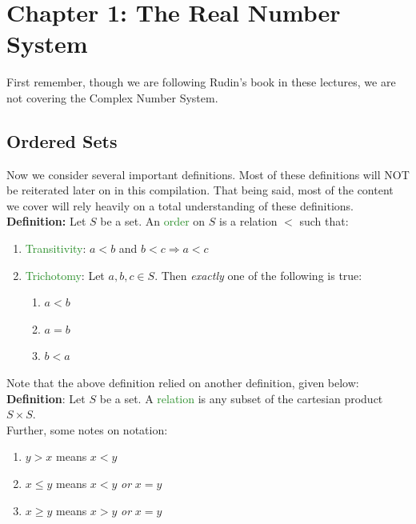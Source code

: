 \documentclass{article}
\begin{document}
\newpage

\section*{Chapter 1: The Real Number System}

First remember, though we are following Rudin's book in these lectures, we are not covering the Complex Number System.



\subsection{Ordered Sets}
Now we consider several important definitions. Most of these definitions will NOT be reiterated later on in this compilation. That being said, most of the content we cover will rely heavily on a total understanding of these definitions.\\

\textbf{Definition:} Let $S$ be a set. An \textcolor{ForestGreen}{order} on $S$ is a relation $<$ such that:
\begin{enumerate}
    \item \textcolor{ForestGreen}{Transitivity}: $a < b$ and $b < c \Longrightarrow a < c$
    \item \textcolor{ForestGreen}{Trichotomy}: Let $a,b,c \in S$. Then \textit{exactly} one of the following is true:
    \begin{enumerate}
        \item $a < b$
        \item $a = b$
        \item $b < a$
    \end{enumerate}
\end{enumerate}

Note that the above definition relied on another definition, given below:\\

\textbf{Definition}: Let $S$ be a set. A \textcolor{ForestGreen}{relation} is any subset of the cartesian product $S \times S$.\\

Further, some notes on notation:
\begin{enumerate}
    \item $y>x$ means $x<y$
    \item $x \leq y$ means $x < y$ \textit{or} $x = y$
    \item $x \geq y$ means $x > y$ \textit{or} $x = y$
\end{enumerate}
\end{document}
